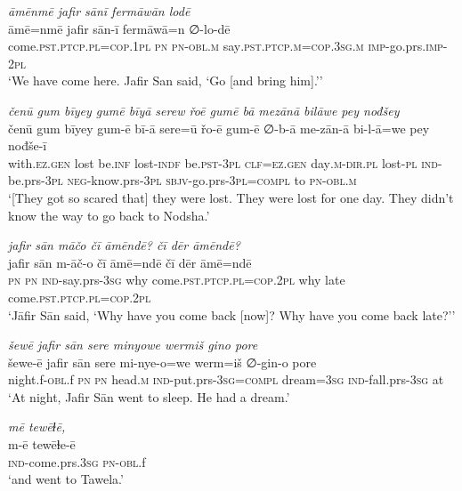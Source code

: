 \ea \label{ŠJ.36}
\textit{āmēnmē jafir sānī fermāwān lodē} \\ 
\gll āmē=nmē jafir sān-ī fermāwā=n ∅-lo-dē \\ 
 come\textsc{.pst}\textsc{.ptcp}\textsc{.pl}\textsc{=cop}\textsc{.\textsc{1pl}} \textsc{pn} \textsc{pn}\textsc{-obl}\textsc{.m} say\textsc{.pst}\textsc{.ptcp}\textsc{.m}\textsc{=cop}\textsc{.3sg}\textsc{.m} \textsc{imp-}go.prs.\textsc{imp-}\textsc{2pl} \\ 
\glt `We have come here. Jafir San said, ‘Go [and bring him].’'
\z 
 
\ea \label{ŠJ.39}
\textit{čenū gum bīyey gumē bīyā serew řoē gumē bā mezānā bilāwe pey nođšey} \\ 
\gll čenū gum bīyey gum-ē bī-ā sere=ū řo-ē gum-ē ∅-b-ā me-zān-ā bi-l-ā=we pey nođše-ī \\ 
 with\textsc{.ez.gen} lost be\textsc{.inf} lost\textsc{-indf} be\textsc{.pst}\textsc{-3pl} \textsc{clf}\textsc{=ez.gen} day\textsc{.m}\textsc{-dir}\textsc{.pl} lost\textsc{\textsc{-pl}} \textsc{ind-}be.prs\textsc{-3pl} \textsc{neg-}know.prs\textsc{-3pl} \textsc{sbjv-}go.prs\textsc{-3pl}\textsc{=compl} to \textsc{pn}\textsc{-obl}\textsc{.m} \\ 
\glt `[They got so scared that] they were lost. They were lost for one day. They didn’t know the way to go back to Nodsha.'
\z 
 
\ea \label{ŠJ.43}
\textit{jafir sān māčo čī āmēndē? čī dēr āmēndē?} \\ 
\gll jafir sān m-āč-o čī āmē=ndē čī dēr āmē=ndē \\ 
 \textsc{pn} \textsc{pn} \textsc{ind-}say.prs\textsc{-3sg} why come\textsc{.pst}\textsc{.ptcp}\textsc{.pl}\textsc{=cop}.\textsc{2pl} why late come\textsc{.pst}\textsc{.ptcp}\textsc{.pl}\textsc{=cop}.\textsc{2pl} \\ 
\glt `Jāfir Sān said, ‘Why have you come back [now]? Why have you come back late?’'
\z 
 
\ea \label{ŠJ.46}
\textit{šewē jafir sān sere minyowe wermiš gino pore} \\ 
\gll šewe-ē jafir sān sere mi-nye-o=we werm=iš ∅-gin-o pore \\ 
 night.f\textsc{-obl}.f \textsc{pn} \textsc{pn} head\textsc{.m} \textsc{ind-}put.prs\textsc{-3sg}\textsc{=compl} dream\textsc{=3sg} \textsc{ind-}fall.prs\textsc{-3sg} at \\ 
\glt `At night, Jafir Sān went to sleep. He had a dream.'
\z 
 
\ea \label{ŠJ.56}
\textit{mē tewēɫē,} \\ 
\gll m-ē tewēɫe-ē \\ 
 \textsc{ind-}come.prs\textsc{.3sg} \textsc{pn}\textsc{-obl}.f \\ 
\glt `and went to Tawela.'
\z 
 
